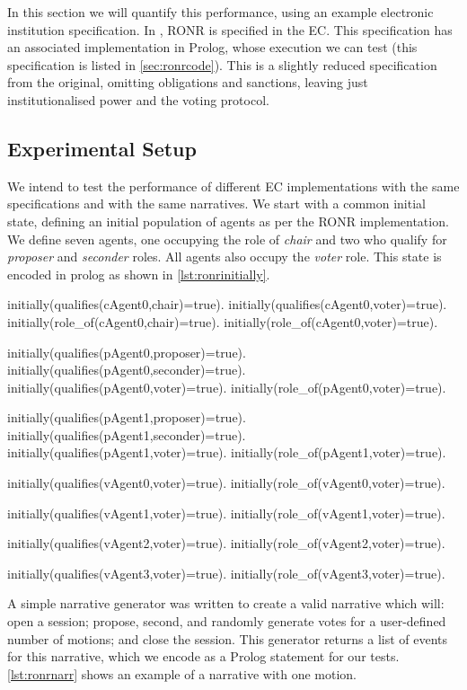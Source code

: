 In this section we will quantify this performance, using an example electronic
institution specification. In \citet{Pitt2005a}, \ac{RONR} is specified in the
\ac{EC}. This specification has an associated implementation in Prolog, whose
execution we can test (this specification is listed in \autoref{sec:ronrcode}).
This is a slightly reduced specification from the original, omitting obligations
and sanctions, leaving just institutionalised power and the voting protocol.

\subsection{Experimental Setup}

We intend to test the performance of different \ac{EC} implementations
with the same specifications and with the same narratives. We start with a
common initial state, defining an initial population of agents as per the \ac{RONR} 
implementation. We define seven agents, one occupying the role of \emph{chair}
and two who qualify for \emph{proposer} and \emph{seconder} roles. All agents
also occupy the \emph{voter} role. This state is encoded in prolog as shown in
\autoref{lst:ronrinitially}.

\begin{prolog}[caption=Initial state of RONR in Prolog,label=lst:ronrinitially]
initially(qualifies(cAgent0,chair)=true).
initially(qualifies(cAgent0,voter)=true).
initially(role_of(cAgent0,chair)=true).
initially(role_of(cAgent0,voter)=true).

initially(qualifies(pAgent0,proposer)=true).
initially(qualifies(pAgent0,seconder)=true).
initially(qualifies(pAgent0,voter)=true).
initially(role_of(pAgent0,voter)=true).

initially(qualifies(pAgent1,proposer)=true).
initially(qualifies(pAgent1,seconder)=true).
initially(qualifies(pAgent1,voter)=true).
initially(role_of(pAgent1,voter)=true).

initially(qualifies(vAgent0,voter)=true).
initially(role_of(vAgent0,voter)=true).

initially(qualifies(vAgent1,voter)=true).
initially(role_of(vAgent1,voter)=true).

initially(qualifies(vAgent2,voter)=true).
initially(role_of(vAgent2,voter)=true).

initially(qualifies(vAgent3,voter)=true).
initially(role_of(vAgent3,voter)=true).
\end{prolog}

A simple narrative generator was written to create a valid narrative which
will: open a session; propose, second, and randomly generate
votes for a user-defined number of motions; and close the session. This
generator returns a list of events for this narrative, which we encode as a
Prolog statement for our tests. \autoref{lst:ronrnarr} shows an example of a
narrative with one motion.

